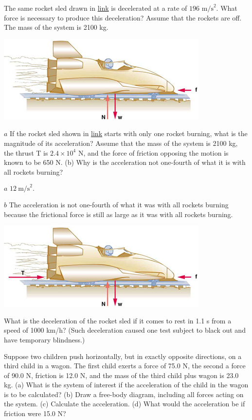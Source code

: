 \documentclass[
]{book}
\newenvironment{problems-exercises}{}{}
\begin{document}
\begin{problems-exercises}
\hypertarget{fs-id1995657}{}
\leavevmode\hypertarget{fs-id3089659}{}%
The same rocket sled drawn in
\protect\hyperlink{fs-id2992955}{link} is decelerated at a rate
of \({1\text{96\ m/s}^{2}}{}\). What force is necessary to produce this
deceleration? Assume that the rockets are off. The mass of the system is
2100 kg.

\includegraphics{images/Figure_04_03_07.jpg}

\hypertarget{fs-id2673239}{}
\leavevmode\hypertarget{fs-id3358193}{}%
\(a\) If the rocket sled shown in
\protect\hyperlink{fs-id1870792}{link} starts with only one
rocket burning, what is the magnitude of its acceleration? Assume that
the mass of the system is 2100 kg, the thrust T is \(2.4 \times 10^{4}\)
N, and the force of friction opposing the motion is known to be 650 N.
(b) Why is the acceleration not one-fourth of what it is with all
rockets burning?

\leavevmode\hypertarget{eip-id1494654}{}%
\(a\) \(12\ \text{m/s}^{2}\).

\(b\) The acceleration is not one-fourth of what it was with all rockets
burning because the frictional force is still as large as it was with
all rockets burning.

\includegraphics{images/Figure_04_03_05.jpg}

\hypertarget{fs-id2409301}{}
\leavevmode\hypertarget{fs-id2584328}{}%
What is the deceleration of the rocket sled if it comes to rest in 1.1 s
from a speed of 1000 km/h? (Such deceleration caused one test subject to
black out and have temporary blindness.)

\hypertarget{fs-id2963161}{}
\leavevmode\hypertarget{fs-id1870548}{}%
Suppose two children push horizontally, but in exactly opposite
directions, on a third child in a wagon. The first child exerts a force
of 75.0 N, the second a force of 90.0 N, friction is 12.0 N, and the
mass of the third child plus wagon is 23.0 kg. (a) What is the system of
interest if the acceleration of the child in the wagon is to be
calculated? (b) Draw a free-body diagram, including all forces acting on
the system. (c) Calculate the acceleration. (d) What would the
acceleration be if friction were 15.0 N?


\end{problems-exercises}
\end{document}
